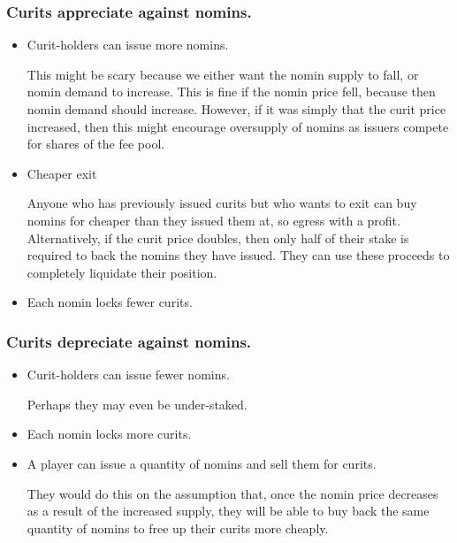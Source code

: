 \subsubsection{Curits appreciate against nomins.} \label{sec:curit-nomin-appreciation}
\begin{itemize}
	\item{Curit-holders can issue more nomins.}

	This might be scary because we either want the nomin supply to fall, or nomin demand to increase.
	This is fine if the nomin price fell, because then nomin demand should increase.
	However, if it was simply that the curit price increased, then this might encourage
	oversupply of nomins as issuers compete for shares of the fee pool.

	\item{Cheaper exit}

	Anyone who has previously issued curits but who wants to exit can buy nomins for
	cheaper than they issued them at, so egress with a profit.
	Alternatively, if the curit price doubles, then only half of their stake is required
	to back the nomins they have issued. They can use these proceeds to completely liquidate
	their position.

	\item{Each nomin locks fewer curits.}
	
\end{itemize}

\subsubsection{Curits depreciate against nomins.} \label{sec:curit-nomin-depreciation}

\begin{itemize}
	\item{Curit-holders can issue fewer nomins.}
	
	Perhaps they may even be under-staked.

	\item{Each nomin locks more curits.}
	\item{A player can issue a quantity of nomins and sell them for curits.}
		  
	They would do this on the assumption that, once the nomin price decreases as a result of the increased
	supply, they will be able to buy back the same quantity of nomins to free up their
	curits more cheaply.
\end{itemize}

